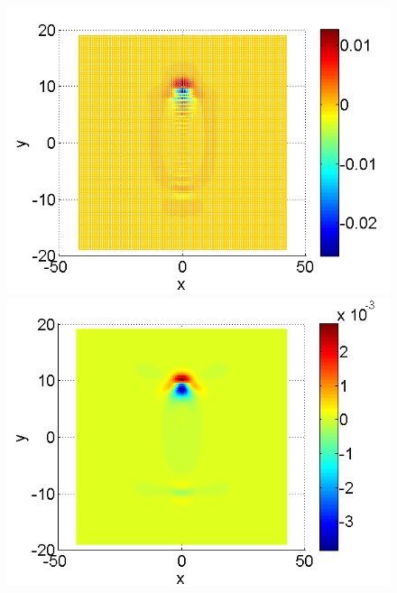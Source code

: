 \documentclass[a4paper]{article}
\theoremstyle{remark}
\begin{document}
\begin{large}
\begin{figure}[ht]\vspace{0.4cm}
	\begin{minipage}[b]{0.32\linewidth}
		\includegraphics[width=\linewidth]{SolutionDiff/TaylorZeroBndVsEnergySave_128_ZB2_bt1_c090_h040_O(h^2).png}
	\end{minipage}	
	\begin{minipage}[b]{0.32\linewidth}
		\includegraphics[width=\linewidth]{SolutionDiff/TaylorZeroBndVsEnergySave_128_ZB2_bt1_c090_h020_O(h^2).png}
	\end{minipage}	
	\begin{minipage}[b]{0.32\linewidth}

\end{minipage}
\end{figure}
\end{large}
\end{document}
